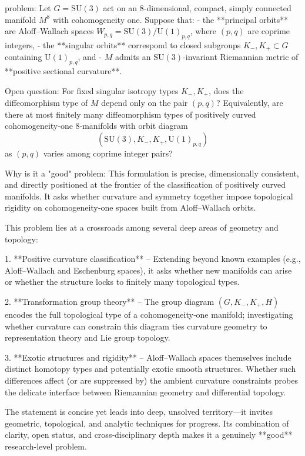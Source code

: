 problem:  
Let \( G = \mathrm{SU}(3) \) act on an 8‑dimensional, compact, simply connected manifold \( M^8 \) with cohomogeneity one.  
Suppose that:  
- the **principal orbits** are Aloff–Wallach spaces \( W_{p,q} = \mathrm{SU}(3)/\mathrm{U}(1)_{p,q} \), where \( (p,q) \) are coprime integers,  
- the **singular orbits** correspond to closed subgroups \( K_-, K_+ \subset G \) containing \( \mathrm{U}(1)_{p,q} \), and  
- \( M \) admits an \( \mathrm{SU}(3) \)-invariant Riemannian metric of **positive sectional curvature**.  

Open question:  
For fixed singular isotropy types \( K_-, K_+ \), does the diffeomorphism type of \( M \) depend only on the pair \((p,q)\)?  
Equivalently, are there at most finitely many diffeomorphism types of positively curved cohomogeneity‑one 8‑manifolds with orbit diagram  
\[
(\mathrm{SU}(3), K_-, K_+, \mathrm{U}(1)_{p,q})
\]
as \((p,q)\) varies among coprime integer pairs?

Why is it a "good" problem:  
This formulation is precise, dimensionally consistent, and directly positioned at the frontier of the classification of positively curved manifolds. It asks whether curvature and symmetry together impose topological rigidity on cohomogeneity‑one spaces built from Aloff–Wallach orbits.  

This problem lies at a crossroads among several deep areas of geometry and topology:  

1. **Positive curvature classification** – Extending beyond known examples (e.g., Aloff–Wallach and Eschenburg spaces), it asks whether new manifolds can arise or whether the structure locks to finitely many topological types.  

2. **Transformation group theory** – The group diagram \((G, K_-, K_+, H)\) encodes the full topological type of a cohomogeneity‑one manifold; investigating whether curvature can constrain this diagram ties curvature geometry to representation theory and Lie group topology.  

3. **Exotic structures and rigidity** – Aloff–Wallach spaces themselves include distinct homotopy types and potentially exotic smooth structures. Whether such differences affect (or are suppressed by) the ambient curvature constraints probes the delicate interface between Riemannian geometry and differential topology.  

The statement is concise yet leads into deep, unsolved territory—it invites geometric, topological, and analytic techniques for progress. Its combination of clarity, open status, and cross‑disciplinary depth makes it a genuinely **good** research-level problem.